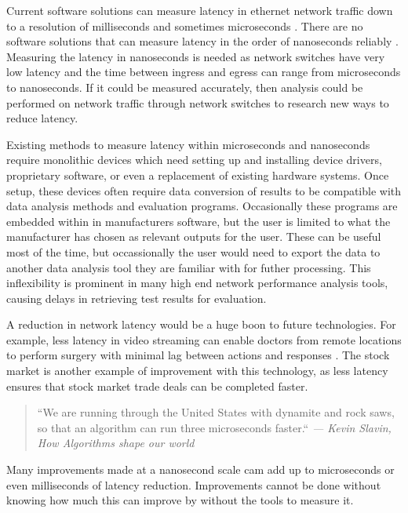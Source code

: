\par Current software solutions can measure latency in ethernet network traffic down to a resolution of
milliseconds and sometimes microseconds \cite{pingisbad}. There are no software solutions that can measure
latency in the order of nanoseconds reliably \cite{timeinlinux}. Measuring the latency in nanoseconds is needed as
network switches have very low latency and the time between ingress and egress can range from
microseconds to nanoseconds. If it could be measured accurately, then analysis could be performed
on network traffic through network switches to research new ways to reduce latency.

\par Existing methods to measure latency within microseconds and nanoseconds require monolithic devices which need setting up and installing device drivers, proprietary software, or even a replacement of existing hardware systems.
Once setup, these devices often require data conversion of results to be compatible with data analysis methods and evaluation programs. 
Occasionally these programs are embedded within in manufacturers software, but the user is limited to what the manufacturer has chosen as relevant outputs for the user.
These can be useful most of the time, but occassionally the user would need to export the data to another data analysis tool they are familiar with for futher processing.
This inflexibility is prominent in many high end network performance analysis tools, causing delays in retrieving test results for evaluation.

\par A reduction in network latency would be a huge boon to future technologies. For example, less
latency in video streaming can enable doctors from remote locations to perform surgery with
minimal lag between actions and responses \cite{remotesurgery}. The stock market is another example of improvement with
this technology, as less latency ensures that stock market trade deals can be completed faster.

\begin{quote}
    \centering
    ``We are running through the United States with dynamite and rock saws, so that an algorithm can
    run three microseconds faster.`` \em --- Kevin Slavin, How Algorithms shape our world \cite{tedTalkAlgorithms}
\end{quote} 

\par Many improvements made at a nanosecond scale cam add up to microseconds or even milliseconds of latency
reduction. Improvements cannot be done without knowing how much this can improve by without the tools to measure it.

